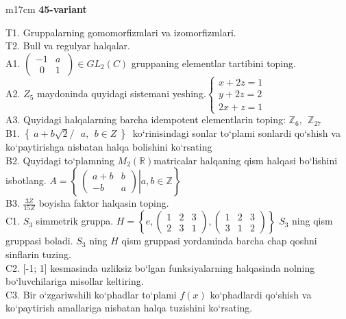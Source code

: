 \documentclass{article}
\begin{document}
\begin{tabular}{m{17cm}}
\textbf{45-variant}
\newline

T1. Gruppalarning gomomorfizmlari va izomorfizmlari. \\
T2. Bull va regulyar halqalar. \\
A1. \(\left( \begin{matrix}
 - 1 & a \\
\ \ 0 & 1
\end{matrix}\  \right) \in GL_{2}(C)\) gruppaning elementlar tartibini toping. \\
A2. \(Z_{5}\) maydoninda quyidagi sistemani yeshing.\(\left\{ \begin{matrix}
x + 2z = 1 \\
y + 2z = 2 \\
2x + z = 1
\end{matrix} \right.\ \) \\
A3. Quyidagi halqalarning barcha idempotent elementlarin toping: \(\mathbb{Z}_{6},\ \ \mathbb{Z}_{27}\) \\
B1. \(\left\{ \left. \ a + b\sqrt{2}/\ \ \ a,\ \ b \in Z\  \right\} \right.\ \) ko`rinisindagi sonlar to`plami sonlardi qo`shish va ko`paytirishga nisbatan halqa bolishini ko`rsating \\
B2. Quyidagi to`plamning \(M_{2}(\mathbb{R})\)matricalar halqaning qism halqasi bo`lishini isbotlang. \(A = \left\{ \left. \ \begin{pmatrix}
a + b & b \\
 - b & a
\end{pmatrix} \right|a,b\mathbb{\in Z} \right\}\) \\
B3. \(\frac{3Z}{15Z}\) boyisha faktor halqasin toping. \\
C1. \(S_{3}\) simmetrik gruppa. \(H = \left\{ e,\begin{pmatrix}
1 & 2 & 3 \\
2 & 3 & 1
\end{pmatrix},\begin{pmatrix}
1 & 2 & 3 \\
3 & 1 & 2
\end{pmatrix} \right\}\) \(S_{3}\) ning qism gruppasi boladi. \(S_{3}\) ning \(H\) qism gruppasi yordaminda barcha chap qo\textquotesingle shni sinflarin tuzing. \\
C2. {[}-1; 1{]} kesmasinda uzliksiz bo`lgan funksiyalarning halqasinda nolning bo`luvchilariga misollar keltiring. \\
C3. Bir o`zgariwshili ko`phadlar to`plami \(f(x)\) ko`phadlardi qo`shish va ko`paytirish amallariga nisbatan halqa tuzishini ko`rsating. \\

\end{tabular}
\vspace{1cm}
\end{document}
